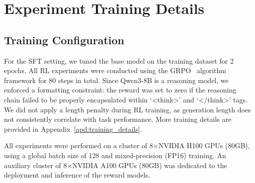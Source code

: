 \section{Experiment Training Details} 


\subsection{Training Configuration} \label{sec:training_config}
For the SFT setting, we tuned the base model on the training dataset for 2 epochs. All RL experiments were conducted using the GRPO~\citep{grpo} algorithm framework for 80 steps in total. Since Qwen3-8B is a reasoning model, we enforced a formatting constraint: the reward was set to zero if the reasoning chain failed to be properly encapsulated within `<think>' and `</think>' tags. We did not apply a length penalty during RL training, as generation length does not consistently correlate with task performance. More training details are provided in Appendix~\ref{apd:training_details}.

All experiments were performed on a cluster of 8\(\times\)NVIDIA H100 GPUs (80GB), using a global batch size of 128 and mixed-precision (FP16) training. An auxiliary cluster of 8\(\times\)NVIDIA A100 GPUs (80GB) was dedicated to the deployment and inference of the reward models.





